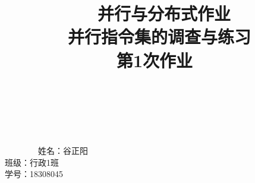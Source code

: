 \documentclass[UTF8,12pt]{article}
\title{\heiti {\Huge 并行与分布式作业}\\{\LARGE 并行指令集的调查与练习\\第1次作业}}
\date{}
\author{}
\begin{document}
    \begin{titlepage}
        \maketitle
        \vspace{45ex}
        \begin{center}
            {\Large{姓名：谷正阳\\班级：行政1班\\学号：18308045}}
        \end{center}
        \thispagestyle{empty}
    \end{titlepage}
    \newpage
\end{document}
